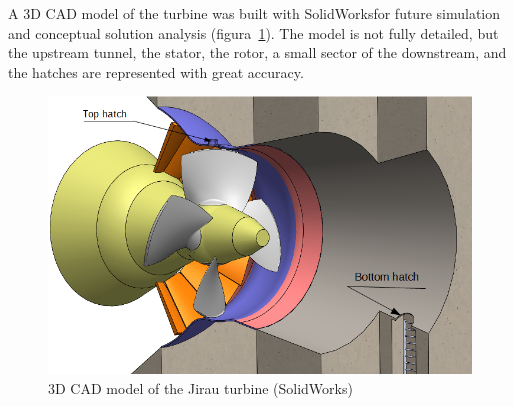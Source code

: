 A 3D CAD model of the turbine was built with SolidWorks\textregistered  for
future simulation and conceptual solution analysis (figura~\ref{fig::ambiente3d}). The model is
not fully detailed, but the upstream tunnel, the stator, the rotor, a small
sector of the downstream, and the hatches are represented with great accuracy.

\begin{figure}[h!]
\centering
	\includegraphics[width=\columnwidth]{figs/estudo/solid/ambiente_3d} 
	\caption{3D CAD model of the Jirau turbine (SolidWorks)}
	\label{fig::ambiente3d}
\end{figure}




